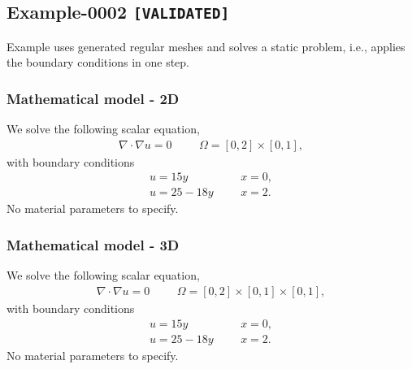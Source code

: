%
\clearpage
%
\subsection{Example-0002 \texttt{[VALIDATED]}}
%
Example uses generated regular meshes and solves a static problem, i.e., applies
the boundary conditions in one step.
%
%
\subsubsection{Mathematical model - 2D}
%
We solve the following scalar equation,
%
\begin{align}
    \nabla \cdot \nabla u = 0 & &&\Omega = [0, 2] \times [0, 1],
\end{align}
%
with boundary conditions
%
\begin{align}
    u = 15 y      & &&x = 0, \\
    u = 25 - 18 y & &&x = 2.
\end{align}
%
No material parameters to specify.
%
%
\subsubsection{Mathematical model - 3D}
%
We solve the following scalar equation,
%
\begin{align}
    \nabla \cdot \nabla u = 0 & &&\Omega = [0, 2] \times [0, 1] \times [0, 1],
\end{align}
%
with boundary conditions
%
\begin{align}
    u = 15 y      & &&x = 0, \\
    u = 25 - 18 y & &&x = 2.
\end{align}
%
No material parameters to specify.
%
%
